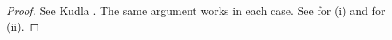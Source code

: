 \documentclass{amsart}
\theoremstyle{definition}
\theoremstyle{definition}
\theoremstyle{definition}
\begin{document}
\begin{proof} See Kudla \cite[Proposition 2.5]{KuBF}. 
The same argument works in each case. See \cite[Lemma 4.5]{BY} for (i) and \cite[Lemma 4.14]{VO} for (ii). 

\end{proof}
\end{document}
